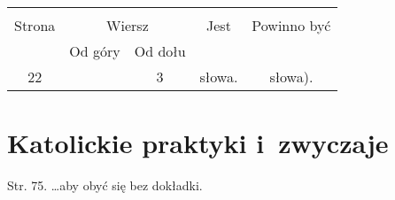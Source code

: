 \documentclass[a4paper,11pt]{article}
\begin{document}
\begin{center}

  \begin{tabular}{|c|c|c|c|c|}
    \hline
    & \multicolumn{2}{c|}{} & & \\
    Strona & \multicolumn{2}{c|}{Wiersz} & Jest
                              & Powinno być \\ \cline{2-3}
    & Od góry & Od dołu & & \\
    \hline
    22  & &  3 & słowa. & słowa). \\
    \hline
  \end{tabular}

\end{center}

\vspace{\spaceTwo}














\newpage
\section{Katolickie praktyki i~zwyczaje}

\vspace{\spaceTwo}







Str. 75. \ldots aby obyć się bez dokładki.
\end{document}
